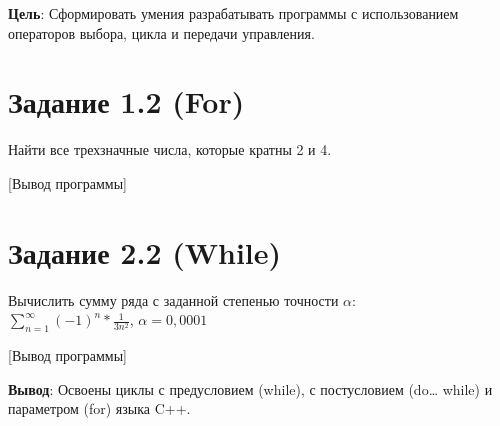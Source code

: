 \documentclass[variant=labwork]{bsuir}
\begin{document}
\maketitle
\mainmatter

\textbf{Цель}: Сформировать умения разрабатывать программы с использованием
операторов выбора, цикла и передачи управления.

\section*{Задание 1.2 (For)}

Найти все трехзначные числа, которые кратны 2 и 4.


[Вывод программы]


\section*{Задание 2.2 (While)}

Вычислить сумму ряда с заданной степенью точности $\alpha$:\\$\displaystyle
\sum_{n=1}^{\infty}(-1)^n*\frac{1}{3n^2}$, $\alpha=0,0001$


[Вывод программы]


\textbf{Вывод}: Освоены циклы с предусловием (while), с постусловием (do\ldots
while) и параметром (for) языка C++.
\end{document}
